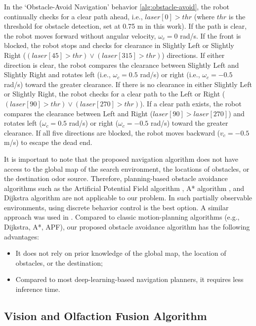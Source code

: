 In the `Obstacle-Avoid Navigation' behavior \ref{alg:obstacle-avoid}, the robot continually checks for a clear path ahead, i.e., $laser[0] > thr$ (where $thr$ is the threshold for obstacle detection, set at 0.75 m in this work). If the path is clear, the robot moves forward without angular velocity, $\omega_{c} = 0$ rad/s. If the front is blocked, the robot stops and checks for clearance in Slightly Left or Slightly Right ($(laser[45] > thr) \lor (laser[315] > thr)$) directions. If either direction is clear, the robot compares the clearance between Slightly Left and Slightly Right and rotates left (i.e., $\omega_{c} = 0.5$ rad/s) or right (i.e., $\omega_{c} = -0.5$ rad/s) toward the greater clearance. If there is no clearance in either Slightly Left or Slightly Right, the robot checks for a clear path to the Left or Right ($(laser[90] > thr) \lor (laser[270] > thr)$). If a clear path exists, the robot compares the clearance between Left and Right ($laser[90] > laser[270]$) and rotates left ($\omega_{c} = 0.5$ rad/s) or right ($\omega_{c} = -0.5$ rad/s) toward the greater clearance. If all five directions are blocked, the robot moves backward ($v_c = -0.5$ m/s) to escape the dead end.

It is important to note that the proposed navigation algorithm does not have access to the global map of the search environment, the locations of obstacles, or the destination odor source. Therefore, planning-based obstacle avoidance algorithms such as the Artificial Potential Field algorithm \cite{al2022new}, A* algorithm \cite{xiang2022combined}, and Dijkstra algorithm \cite{luo2020surface} are not applicable to our problem. In such partially observable environments, using discrete behavior control is the best option. A similar approach was used in \cite{kahn2021badgr}. Compared to classic motion-planning algorithms (e.g., Dijkstra, A*, APF), our proposed obstacle avoidance algorithm has the following advantages:
\begin{itemize}
    \item It does not rely on prior knowledge of the global map, the location of obstacles, or the destination;
    \item Compared to most deep-learning-based navigation planners, it requires less inference time.
\end{itemize}


\subsection{Vision and Olfaction Fusion Algorithm}\label{Subsec:fusionROSL}

